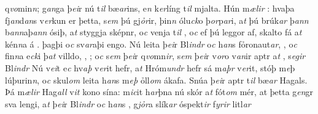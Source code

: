 q\textit{vo}min\textit{n}; g\textit{an}ga þ\textit{ei}r nú t\textit{il}
bæ\textit{ar}ins, e\textit{n} k\textit{er}líng t\textit{il}
mjalta. Hún m\textit{ælir} : 
hvaþa fj\textit{an}d\textit{an}s v\textit{er}kun er þetta, s\textit{em}
þú  gj\textit{ỏr}ir, þin\textit{n} ólu\textit{ck}o þ\textit{or}p\textit{ar}i, a\textit{t} þú brúk\textit{ar}
þ\textit{an}\textit{n} b\textit{an}\textit{n}aþ\textit{an}\textit{n} ósiþ,
a\textit{t} styggja sképnr, o\textit{c} venja t\textit{il} , 
o\textit{c} ef þú leggor   af,  
 skalto fá a\textit{t} kén\textit{n}a á  .   þagþi o\textit{c} sv\textit{ar}aþi engo. Nú leita þ\textit{ei}r
Bl\textit{indr} o\textit{c} h\textit{an}s fỏronaut\textit{ar},  
, 
o\textit{c} fin\textit{n}a   e\textit{ck}i þ\textit{at} villdo,  ,  ; 
o\textit{c} s\textit{em} þ\textit{ei}r    q\textit{vo}mn\textit{ir}, s\textit{em} þ\textit{ei}r v\textit{or}o
v\textit{an}ir aptr a\textit{t} , 
s\textit{egir} Bl\textit{indr} 
Nú v\textit{ei}t e\textit{c} hv\textit{aþ} v\textit{er}it hefr,
a\textit{t} Hróm\textit{undr} hefr sá m\textit{aþr} v\textit{er}it,   stóþ m\textit{e}þ lúþurin\textit{n}, o\textit{c} 
skul\textit{om}  
leita h\textit{an}s m\textit{eþ} ỏll\textit{om} ákafa. Snúa þ\textit{ei}r   aptr t\textit{il} bæ\textit{ar} Hagals. 
Þá m\textit{ælir} Hag\textit{all} v\textit{it} kono sína: m\textit{ic}it h\textit{ar}þna nú skór
a\textit{t} fót\textit{om} mér, at  þetta g\textit{en}gr sva
lengi, a\textit{t} þ\textit{ei}r Bl\textit{indr} o\textit{c}
h\textit{an}s  , g\textit{jỏr}a   slík\textit{ar} óspekt\textit{ir} f\textit{yrir} litl\textit{ar}
